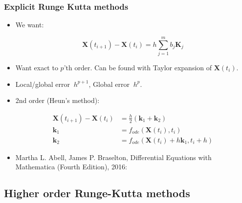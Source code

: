 \documentclass{beamer}
\begin{document}
\begin{frame}
\frametitle{Explicit Runge Kutta methods}
\begin{itemize}

\item<1-> We want:

\begin{equation*}
\mathbf{X}(t_{i+1})-\mathbf{X}(t_{i}) =  h \sum_{j=1}^{m} b_j \mathbf{K}_j
\end{equation*}

\item<2-> Want exact to $p$'th order. Can be found with Taylor expansion of $\mathbf{X}(t_{i})$.

\item<3-> Local/global error  $~h^{p+1}$, Global error $~h^p$.

\item<4-> 2nd order (Heun's method):

\begin{align*}
\mathbf{X}(t_{i+1})-\mathbf{X}(t_{i}) &= \frac{h}{2}(\mathbf{k}_1+\mathbf{k}_2)\\
\mathbf{k}_1 &= f_{ode}(\mathbf{X}(t_i),t_i)\\
\mathbf{k}_2 &= f_{ode}(\mathbf{X}(t_i)+h\mathbf{k}_1,t_i+h)
\end{align*}

\item<1-> {{\color{gray} Martha L. Abell, James P. Braselton, Differential Equations with Mathematica (Fourth Edition), 2016}}:
\end{itemize}
\end{frame}


\subsection{Higher order Runge-Kutta methods}
\end{document}
